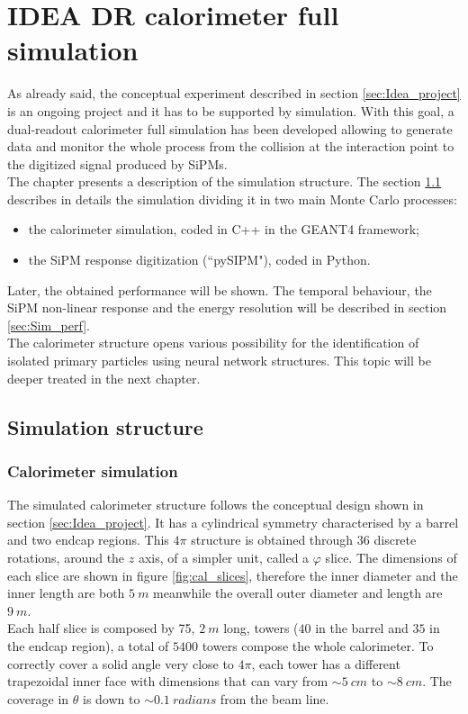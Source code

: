 \chapter{IDEA DR calorimeter full simulation}
As already said, the conceptual experiment described in section \ref{sec:Idea_project} is an ongoing project and it has to be supported by simulation.
With this goal, a dual-readout calorimeter full simulation has been developed allowing to generate data and monitor the whole process from the collision at the interaction point to the digitized signal produced by SiPMs.\\

The chapter presents a description of the simulation structure. The section \ref{sec:Sim_struc} describes in details the simulation dividing it in two main Monte Carlo processes:
\begin{itemize}
	\item the calorimeter simulation, coded in C++ in the GEANT4 framework;
	\item the SiPM response digitization (``pySIPM"), coded in Python.
\end{itemize}

Later, the obtained performance will be shown. The temporal behaviour, the SiPM non-linear response and the energy resolution will be described in section \ref{sec:Sim_perf}.\\

The calorimeter structure opens various possibility for the identification of isolated primary particles using neural network structures. This topic will be deeper treated in the next chapter.\\

\section{Simulation structure} \label{sec:Sim_struc}

\subsection{Calorimeter simulation} \label{subsec:Sim_cal}
The simulated calorimeter structure follows the conceptual design shown in section \ref{sec:Idea_project}. It has a cylindrical symmetry characterised by a barrel and two endcap regions. This $4\pi$ structure is obtained through $36$ discrete rotations, around the $z$ axis, of a  simpler unit, called a $\varphi$ slice. The dimensions of each slice are shown in figure \ref{fig:cal_slices}, therefore the inner diameter and  the inner length are both $5\ m$ meanwhile the overall outer diameter and length are $9\ m$.\\
Each half slice is composed by 75, $2\ m$ long, towers ($40$ in the barrel and $35$ in the endcap region), a total of $5400$ towers compose the whole calorimeter.
To correctly cover a solid angle very close to $4\pi$, each tower has a different trapezoidal inner face with dimensions that can vary from $\sim 5\ cm$ to $\sim 8\ cm$. The coverage in $\theta$ is down to $\sim 0.1\ radians$ from the beam line.\\

